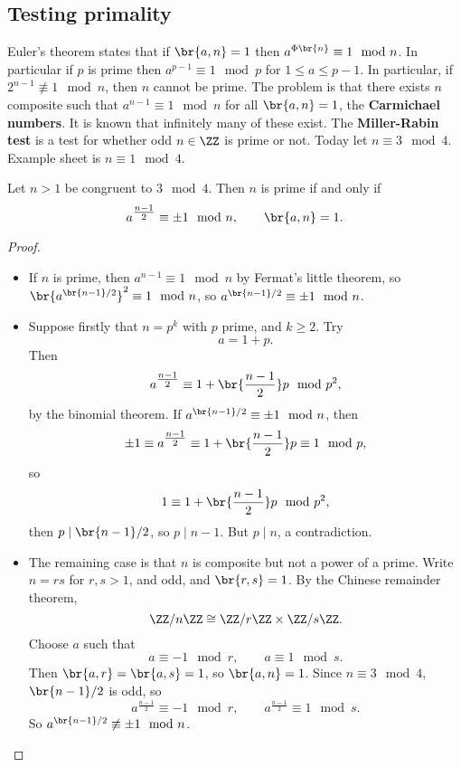 \subsection{Testing primality}


Euler's theorem states that if $ \br{a, n} = 1 $ then $ a^{\Phi\br{n}} \equiv 1 \mod n $. In particular if $ p $ is prime then $ a^{p - 1} \equiv 1 \mod p $ for $ 1 \le a \le p - 1 $. In particular, if $ 2^{n - 1} \not\equiv 1 \mod n $, then $ n $ cannot be prime. The problem is that there exists $ n $ composite such that $ a^{n - 1} \equiv 1 \mod n $ for all $ \br{a, n} = 1 $, the \textbf{Carmichael numbers}. It is known that infinitely many of these exist. The \textbf{Miller-Rabin test} is a test for whether odd $ n \in \ZZ $ is prime or not. Today let $ n \equiv 3 \mod 4 $. Example sheet is $ n \equiv 1 \mod 4 $.

\begin{lemma}
\label{lem:30}
Let $ n > 1 $ be congruent to $ 3 \mod 4 $. Then $ n $ is prime if and only if
$$ a^{\tfrac{n - 1}{2}} \equiv \pm 1 \mod n, \qquad \br{a, n} = 1. $$
\end{lemma}

\pagebreak

\begin{proof}
\hfill
\begin{itemize}
\item If $ n $ is prime, then $ a^{n - 1} \equiv 1 \mod n $ by Fermat's little theorem, so $ \br{a^{\br{n - 1} / 2}}^2 \equiv 1 \mod n $, so $ a^{\br{n - 1} / 2} \equiv \pm 1 \mod n $.
\item Suppose firstly that $ n = p^k $ with $ p $ prime, and $ k \ge 2 $. Try
$$ a = 1 + p. $$
Then
$$ a^{\tfrac{n - 1}{2}} \equiv 1 + \br{\dfrac{n - 1}{2}}p \mod p^2, $$
by the binomial theorem. If $ a^{\br{n - 1} / 2} \equiv \pm 1 \mod n $, then
$$ \pm 1 \equiv a^{\tfrac{n - 1}{2}} \equiv 1 + \br{\dfrac{n - 1}{2}}p \equiv 1 \mod p, $$
so
$$ 1 \equiv 1 + \br{\dfrac{n - 1}{2}}p \mod p^2, $$
then $ p \mid \br{n - 1} / 2 $, so $ p \mid n - 1 $. But $ p \mid n $, a contradiction.
\item The remaining case is that $ n $ is composite but not a power of a prime. Write $ n = rs $ for $ r, s > 1 $, and odd, and $ \br{r, s} = 1 $. By the Chinese remainder theorem,
$$ \ZZ / n\ZZ \cong \ZZ / r\ZZ \times \ZZ / s\ZZ. $$
Choose $ a $ such that
$$ a \equiv -1 \mod r, \qquad a \equiv 1 \mod s. $$
Then $ \br{a, r} = \br{a, s} = 1 $, so $ \br{a, n} = 1 $. Since $ n \equiv 3 \mod 4 $, $ \br{n - 1} / 2 $ is odd, so
$$ a^{\tfrac{n - 1}{2}} \equiv -1 \mod r, \qquad a^{\tfrac{n - 1}{2}} \equiv 1 \mod s. $$
So $ a^{\br{n - 1} / 2} \not\equiv \pm 1 \mod n $.
\end{itemize}
\end{proof}

